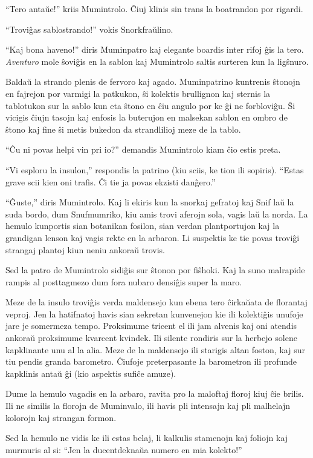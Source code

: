 ``Tero antaŭe!'' kriis Mumintrolo. Ĉiuj klinis sin trans la boatrandon por rigardi.

``Troviĝas sablostrando!'' vokis Snorkfraŭlino.

``Kaj bona haveno!'' diris Muminpatro kaj elegante boardis inter rifoj ĝis la tero. \emph{Aventuro} mole ŝoviĝis en la sablon kaj Mumintrolo saltis surteren kun la ligŝnuro.

Baldaŭ la strando plenis de fervoro kaj agado. Muminpatrino kuntrenis ŝtonojn en fajrejon por varmigi la patkukon, ŝi kolektis brullignon kaj sternis la tablotukon sur la sablo kun eta ŝtono en ĉiu angulo por ke ĝi ne forbloviĝu. Ŝi vicigis ĉiujn tasojn kaj enfosis la buterujon en malsekan sablon en ombro de ŝtono kaj fine ŝi metis bukedon da strandlilioj meze de la tablo.

``Ĉu ni povas helpi vin pri io?'' demandis Mumintrolo kiam ĉio estis preta.

``Vi esploru la insulon,'' respondis la patrino (kiu sciis, ke tion ili sopiris). ``Estas grave scii kien oni trafis. Ĉi tie ja povas ekzisti danĝero.''

``Ĝuste,'' diris Mumintrolo. Kaj li ekiris kun la snorkaj gefratoj kaj Snif laŭ la suda bordo, dum Snufmumriko, kiu amis trovi aferojn sola, vagis laŭ la norda. La hemulo kunportis sian botanikan fosilon, sian verdan plantportujon kaj la grandigan lenson kaj vagis rekte en la arbaron. Li suspektis ke tie povas troviĝi strangaj plantoj kiun neniu ankoraŭ trovis.

Sed la patro de Mumintrolo sidiĝis sur ŝtonon por fiŝhoki. Kaj la suno malrapide rampis al posttagmezo dum fora nubaro densiĝis super la maro.

Meze de la insulo troviĝis verda maldensejo kun ebena tero ĉirkaŭata de florantaj veproj. Jen la hatifnatoj havis sian sekretan kunvenejon kie ili kolektiĝis unufoje jare je somermeza tempo. Proksimume tricent el ili jam alvenis kaj oni atendis ankoraŭ proksimume kvarcent kvindek. Ili silente rondiris sur la herbejo solene kapklinante unu al la alia. Meze de la maldensejo ili starigis altan foston, kaj sur tiu pendis granda barometro. Ĉiufoje preterpasante la barometron ili profunde kapklinis antaŭ ĝi (kio aspektis sufiĉe amuze).

Dume la hemulo vagadis en la arbaro, ravita pro la maloftaj floroj kiuj ĉie brilis. Ili ne similis la florojn de Muminvalo, ili havis pli intensajn kaj pli malhelajn kolorojn kaj strangan formon.

Sed la hemulo ne vidis ke ili estas belaj, li kalkulis stamenojn kaj foliojn kaj murmuris al si: ``Jen la ducentdeknaŭa numero en mia kolekto!''

